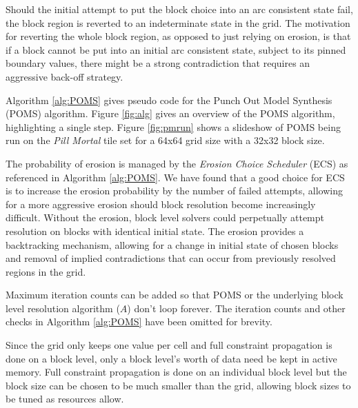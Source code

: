 Should the initial attempt to put the block choice into an arc consistent state fail,
the block region is reverted to an indeterminate state in the grid.
The motivation for reverting the whole block region, as opposed to just relying on erosion,
is that if a block cannot be put into an initial arc consistent state, subject to its pinned
boundary values, there might be a strong contradiction that requires an aggressive
back-off strategy.

Algorithm \ref{alg:POMS} gives pseudo code for the Punch Out Model Synthesis (POMS) algorithm.
Figure \ref{fig:alg} gives an overview of the POMS algorithm, highlighting
a single step.
Figure \ref{fig:pmrun} shows a slideshow of POMS being run on the \textit{Pill Mortal}
tile set for a 64x64 grid size with a 32x32 block size.

The probability of erosion is managed by the \textit{Erosion Choice Scheduler} (ECS) as referenced in Algorithm \ref{alg:POMS}.
We have found that a good choice for ECS is to increase the erosion probability by the number of failed attempts, allowing
for a more aggressive erosion should block resolution become increasingly difficult.
Without the erosion, block level solvers could
perpetually attempt resolution on blocks with identical initial state.
The erosion provides a backtracking mechanism, allowing for a change in initial state
of chosen blocks and removal of implied contradictions that can occur from previously resolved regions in the grid.

Maximum iteration counts can be added so that POMS or the underlying block level resolution
algorithm ($A$) don't loop forever.
The iteration counts and other checks in Algorithm \ref{alg:POMS} have been omitted for brevity.


Since the grid only keeps one value per cell and full constraint propagation is done
on a block level, only a block level's worth of data need be kept in active memory.
Full constraint propagation is done on an individual block level but the block size can be
chosen to be much smaller than the grid, allowing block sizes to be tuned as resources allow.


